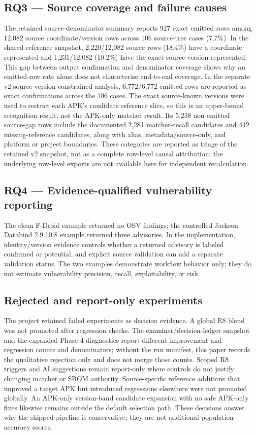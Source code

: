 \documentclass[10pt,twocolumn]{article}
\begin{document}
\subsection{RQ3 — Source coverage and failure causes}
The retained source-denominator summary reports 927 exact emitted rows among 12,082 source coordinate/version rows across 106 source-tree cases (7.7\%). In the shared-reference snapshot, 2,220/12,082 source rows (18.4\%) have a coordinate represented and 1,231/12,082 (10.2\%) have the exact source version represented. This gap between output confirmation and denominator coverage shows why an emitted-row rate alone does not characterize end-to-end coverage.
In the separate v2 source-version-constrained analysis, 6,772/6,772 emitted rows are reported as exact confirmations across the 106 cases. The exact source-known versions were used to restrict each APK's candidate reference slice, so this is an upper-bound recognition result, not the APK-only matcher result. Its 5,238 non-emitted source-gap rows include the documented 2,281 matcher-recall candidates and 442 missing-reference candidates, along with alias, metadata/source-only, and platform or project boundaries. These categories are reported as triage of the retained v2 snapshot, not as a complete row-level causal attribution; the underlying row-level exports are not available here for independent recalculation.
\subsection{RQ4 — Evidence-qualified vulnerability reporting}
The clean F-Droid example returned no OSV findings; the controlled Jackson Databind 2.9.10.8 example returned three advisories. In the implementation, identity/version evidence controls whether a returned advisory is labeled confirmed or potential, and explicit source validation can add a separate validation status. The two examples demonstrate workflow behavior only; they do not estimate vulnerability precision, recall, exploitability, or risk.
\subsection{Rejected and report-only experiments}
The project retained failed experiments as decision evidence. A global R8 blend was not promoted after regression checks. The examiner/decision-ledger snapshot and the expanded Phase-4 diagnostics report different improvement and regression counts and denominators; without the run manifest, this paper records the qualitative rejection only and does not merge those counts. Scoped R8 triggers and AI suggestions remain report-only where controls do not justify changing matcher or SBOM authority. Source-specific reference additions that improved a target APK but introduced regressions elsewhere were not promoted globally. An APK-only version-band candidate expansion with no safe APK-only fixes likewise remains outside the default selection path. These decisions answer why the shipped pipeline is conservative; they are not additional population accuracy scores.
\end{document}
